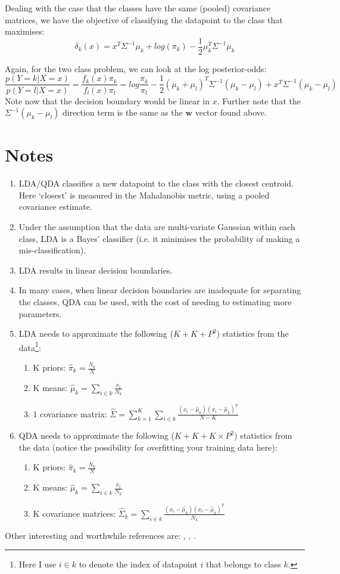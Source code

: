\documentclass{article}
\begin{document}
Dealing with the case that the classes have the same (pooled) covariance matrices, we have the objective of classifying the datapoint to the class that maximises:
$$
\delta_k(x) = x^T \Sigma^{-1}\mu_k + log(\pi_k) -\frac{1}{2}\mu_k^T\Sigma^{-1}\mu_k
$$

Again, for the two class problem, we can look at the log posterior-odds:
$$
\frac{p(Y=k \vert X=x)}{p(Y=l \vert X=x)} = \frac{f_k(x)\pi_k}{f_l(x)\pi_l} = log\frac{\pi_k}{\pi_l} - \frac{1}{2}(\mu_k+\mu_l)^T\Sigma^{-1}(\mu_k-\mu_l) + x^T \Sigma^{-1}(\mu_k - \mu_l)
$$
Note now that the decision boundary would be linear in $x$. Further note that the $\Sigma^{-1}(\mu_k - \mu_l)$ direction term is the same as the $\mathbf{w}$ vector found above.


\section{Notes}
\begin{enumerate}
  \item LDA/QDA classifies a new datapoint to the class with the closest centroid. Here `closest' is measured in the Mahalanobis metric, using a pooled covariance estimate.
  \item Under the assumption that the data are multi-variate Gaussian within each class, LDA is a Bayes' classifier (i.e. it minimises the probability of making a mis-classification).
  \item LDA results in linear decision boundaries.
  \item In many cases, when linear decision boundaries are inadequate for separating the classes, QDA can be used, with the cost of needing to estimating more parameters.
  \item LDA needs to approximate the following ($K + K + P^2$) statistics from the data\footnote{Here I use $i \in k$ to denote the index of datapoint $i$ that belongs to class $k$.}:
  \begin{enumerate}
    \item K priors: $\hat\pi_k = \frac{N_k}{N}$
    \item K means: $\hat\mu_k = \sum_{i \in k} \frac{x_i}{N_k}$
    \item 1 covariance matrix: $\hat\Sigma = \sum_{k=1}^K\sum_{i \in k} \frac{(x_i - \hat\mu_k)(x_i - \hat\mu_k)^T}{N-K}$
  \end{enumerate}
  \item QDA needs to approximate the following ($K + K + K \times P^2$) statistics from the data (notice the possibility for overfitting your training data here):
  \begin{enumerate}
    \item K priors: $\hat\pi_k = \frac{N_k}{N}$
    \item K means: $\hat\mu_k = \sum_{i \in k} \frac{x_i}{N_k}$
    \item K covariance matrices: $\hat\Sigma_k = \sum_{i \in k} \frac{(x_i - \hat\mu_k)(x_i - \hat\mu_k)^T}{N_k}$
  \end{enumerate}
\end{enumerate}

Other interesting and worthwhile references are: \cite{turk1991face}, \cite{belhumeur1997eigenfaces}, \cite{martinez2001pca}.



\end{document}
